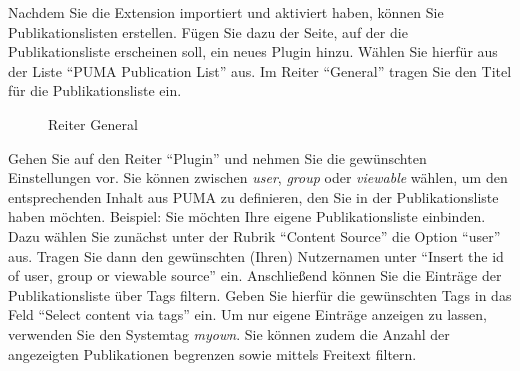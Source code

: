 Nachdem Sie die Extension importiert und aktiviert haben, können Sie Publikationslisten erstellen. Fügen Sie dazu der Seite, auf der die Publikationsliste erscheinen soll, ein neues Plugin hinzu. Wählen Sie hierfür aus der Liste \enquote{PUMA Publication List} aus.\newline
\newline
Im Reiter \enquote{General} tragen Sie den Titel für die Publikationsliste ein.
\begin{figure}[h!]
 \centering
 \caption{Reiter General}
 \label{fig:reiterGeneral}
\end{figure}
\newline \newline
Gehen Sie auf den Reiter \enquote{Plugin} und nehmen Sie die gewünschten Einstellungen vor. Sie können zwischen \textit{user}, \textit{group} oder \textit{viewable} wählen, um den entsprechenden Inhalt aus PUMA zu definieren, den Sie in der Publikationsliste haben möchten.\newline
\newline
Beispiel: Sie möchten Ihre eigene Publikationsliste einbinden. Dazu wählen Sie zunächst unter der Rubrik \enquote{Content Source} die Option \enquote{user} aus. Tragen Sie dann den gewünschten (Ihren) Nutzernamen unter \enquote{Insert the id of user, group or viewable source} ein. Anschließend können Sie die Einträge der Publikationsliste über Tags filtern. Geben Sie hierfür die gewünschten Tags in das Feld \enquote{Select content via tags} ein. Um nur eigene Einträge anzeigen zu lassen, verwenden Sie den Systemtag \textit{myown}. Sie können zudem die Anzahl der angezeigten Publikationen begrenzen sowie mittels Freitext filtern.
